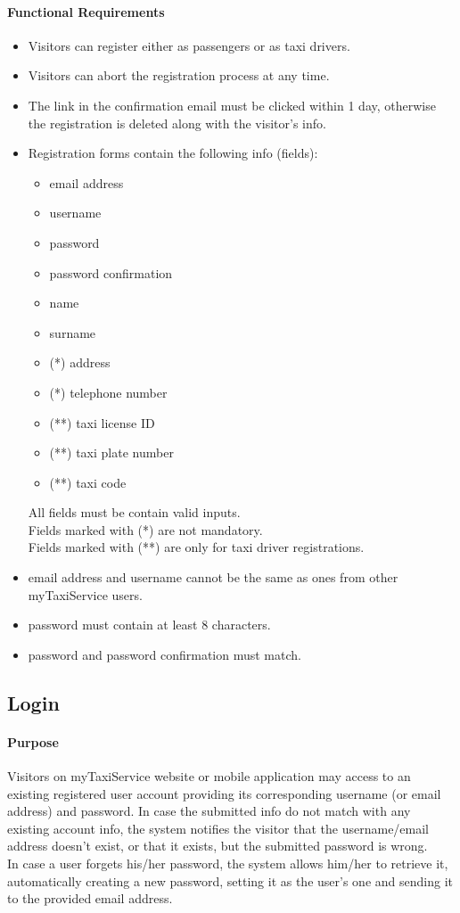 \paragraph{Functional Requirements}
	\begin{itemize}
		\item Visitors can register either as passengers or as taxi drivers.
		\item Visitors can abort the registration process at any time.
		\item The link in the confirmation email must be clicked within 1 day, otherwise the registration is deleted along with the visitor's info.
		\item Registration forms contain the following info (fields):
		\begin{itemize}
			\item email address
			\item username
			\item password
			\item password confirmation
			\item name
			\item surname
			\item (*) address
			\item (*) telephone number
			\item (**) taxi license ID
			\item (**) taxi plate number
			\item (**) taxi code
		\end{itemize}
		All fields must be contain valid inputs.\\
		Fields marked with (*) are not mandatory.\\
		Fields marked with (**) are only for taxi driver registrations.
		\item email address and username cannot be the same as ones from other myTaxiService users.
		\item password must contain at least 8 characters.
		\item password and password confirmation must match.
	\end{itemize}

\subsection{Login}
	\paragraph{Purpose}
		Visitors on myTaxiService website or mobile application may access to an existing registered user account providing its corresponding username (or email address) and password. In case the submitted info do not match with any existing account info, the system notifies the visitor that the username/email address doesn't exist, or that it exists, but the submitted password is wrong.\\
		In case a user forgets his/her password, the system allows him/her to retrieve it, automatically creating a new password, setting it as the user's one and sending it to the provided email address.

